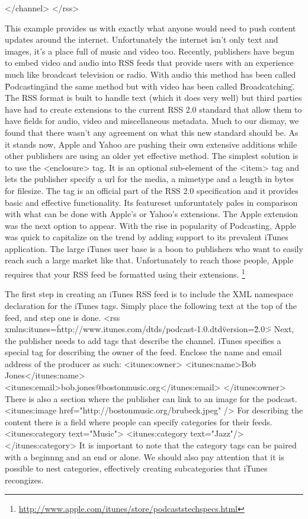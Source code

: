 \documentclass[a4paper,12pt]{report}
\begin{document}
  </channel>
</rss>

This example provides us with exactly what anyone would need to push content updates around the internet.
Unfortunately the internet isn't only text and images, it's a place full of music and video too.
Recently, publishers have begun to embed video and audio into RSS feeds that provide users with an experience much like broadcast television or radio.
With audio this method has been called \"Podcasting\" and the same method but with video has been called \"Broadcatching\".
The RSS format is built to handle text (which it does very well) but third parties have had to create extensions to the current RSS 2.0 standard that allow them to have fields for audio, video and miscellaneous metadata.
Much to our dismay, we found that there wasn't any agreement on what this new standard should be.
As it stands now, Apple and Yahoo are pushing their own extensive additions while other publishers are using an older yet effective method.
The simplest solution is to use the <enclosure> tag.
It is an optional sub-element of the <item> tag and lets the publisher specify a url for the media, a mimetype and a length in bytes for filesize.
The tag is an official part of the RSS 2.0 specification and it provides basic and effective functionality.
Its featureset unforuntately pales in comparison with what can be done with Apple's or Yahoo's extensions.
The Apple extension was the next option to appear.
With the rise in popularity of Podcasting, Apple was quick to capitalize on the trend by adding support to its prevalent iTunes application.
The large iTunes user base is a boon to publishers who want to easily reach such a large market like that.
Unfortunately to reach those people, Apple requires that your RSS feed be formatted using their extensions. \footnote{\url{http://www.apple.com/itunes/store/podcaststechspecs.html}}

The first step in creating an iTunes RSS feed is to include the XML namespace declaration for the iTunes tags.
Simply place the following text at the top of the feed, and step one is done.
<rss xmlns:itunes=\"http://www.itunes.com/dtds/podcast-1.0.dtd\" version=\"2.0\">
Next, the publisher needs to add tags that describe the channel.
iTunes specifies a special tag for describing the owner of the feed.
Enclose the name and email address of the producer as such:
  <itunes:owner>
    <itunes:name>Bob Jones</itunes:name>
    <itunes:email>bob.jones@bostonmusic.org</itunes:email>
  </itunes:owner>
There is also a section where the publisher can link to an image for the podcast.
   <itunes:image href="http://bostonmusic.org/brubeck.jpeg" />
For describing the content there is a field where people can specify categories for their feeds.
	<itunes:category text="Music">
      <itunes:category text="Jazz"/>
   </itunes:category>
It is important to note that the category tags can be paired with a beginnng and an end or alone.
We should also pay attention that it is possible to nest categories, effectively creating subcategories that iTunes recongizes.
\end{document}
